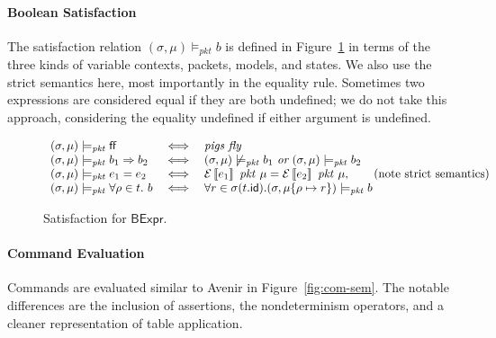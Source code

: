 \documentclass{article}
\newcommand{\pkt}{\mathit{pkt}}
\newcommand{\error}{\mathsf{error}}
\newcommand{\denote}[1]{\left\llbracket#1\right\rrbracket}
\newcommand{\edenote}[1]{\mathcal{E}\denote{#1}}
\newcommand{\FALSE}{\mathsf{ff}}
\newcommand{\BExpr}{\mathsf{BExpr}}
\newcommand{\id}{\mathsf{id}}
\newcommand{\satisfy}[3]{({#1,#3}) \models_{#2}}
\newcommand{\notsatisfy}[3]{({#1,#3})\not\models_{#2}}
\begin{document}
\paragraph{Boolean Satisfaction}
The satisfaction relation $\satisfy \sigma \pkt \mu b$ is defined in
Figure~\ref{fig:bool-satis} in terms of the three kinds of variable contexts,
packets, models, and states. We also use the strict semantics here, most
importantly in the equality rule. Sometimes two expressions are considered equal
if they are both undefined; we do not take this approach, considering the
equality undefined if either argument is undefined.

\begin{figure}
  \[\begin{array}{l>{\iff}cl}
  \satisfy \sigma \pkt \mu \FALSE && \textit{pigs fly} \\
  \satisfy \sigma \pkt \mu b_1 \Rightarrow b_2 &&
  \notsatisfy \sigma \pkt \mu  b_1~\textit{or}~
  \satisfy \sigma \pkt \mu b_2\\
  \satisfy \sigma \pkt \mu e_1 = e_2 &&
  \edenote{e_1}~\pkt~\mu = \edenote{e_2}~\pkt~\mu, \qquad
  \text{(note strict semantics)} \\
  \satisfy \sigma \pkt \mu \forall \rho \in t. ~b &&
  \forall r \in \sigma(t.\id).
  \satisfy \sigma \pkt {\mu\{\rho \mapsto r\}} b
  \end{array}
  \]
  \todo[inline]{Clarify $\error$ states}
  \caption{Satisfaction for $\BExpr$.}
  \label{fig:bool-satis}
\end{figure}

\paragraph{Command Evaluation}
Commands are evaluated similar to Avenir in Figure~\ref{fig:com-sem}. The
notable differences are the inclusion of assertions, the nondeterminism
operators, and a cleaner representation of table application.
\end{document}
